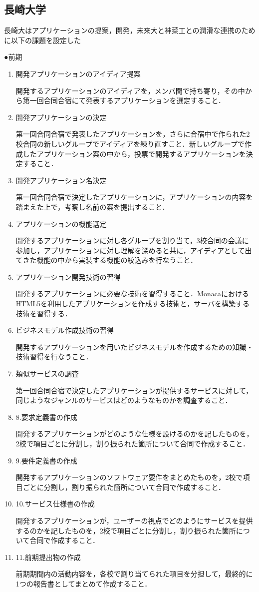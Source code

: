\subsection{長崎大学}
\par 長崎大はアプリケーションの提案，開発，未来大と神菜工との潤滑な連携のために以下の課題を設定した
\par ●前期
\begin{enumerate}
\item 開発アプリケーションのアイディア提案
\par 開発するアプリケーションのアイディアを，メンバ間で持ち寄り，その中から第一回合同合宿にて発表するアプリケーションを選定すること．
\item 開発アプリケーションの決定
\par 第一回合同合宿で発表したアプリケーションを，さらに合宿中で作られた2校合同の新しいグループでアイディアを練り直すこと．新しいグループで作成したアプリケーション案の中から，投票で開発するアプリケーションを決定すること．
\item 開発アプリケーション名決定
\par 第一回合同合宿で決定したアプリケーションに，アプリケーションの内容を踏まえた上で，考察し名前の案を提出すること． 
\item アプリケーションの機能選定
\par 開発するアプリケーションに対し各グループを割り当て，3校合同の会議に参加し，アプリケーションに対し理解を深めると共に，アイディアとして出てきた機能の中から実装する機能の絞込みを行なうこと．
\item アプリケーション開発技術の習得
\par 開発するアプリケーションに必要な技術を習得すること．MonacaにおけるHTML5を利用したアプリケーションを作成する技術と，サーバを構築する技術を習得する．
\item ビジネスモデル作成技術の習得
\par 開発するアプリケーションを用いたビジネスモデルを作成するための知識・技術習得を行なうこと．
\item 類似サービスの調査
\par 第一回合同合宿で決定したアプリケーションが提供するサービスに対して，同じようなジャンルのサービスはどのようなものかを調査すること．
\item 8.要求定義書の作成
\par 開発するアプリケーションがどのような仕様を設けるのかを記したものを，2校で項目ごとに分割し，割り振られた箇所について合同で作成すること．
\item 9.要件定義書の作成
\par 開発するアプリケーションのソフトウェア要件をまとめたものを，2校で項目ごとに分割し，割り振られた箇所について合同で作成すること．
\item 10.サービス仕様書の作成
\par 開発するアプリケーションが，ユーザーの視点でどのようにサービスを提供するのかを記したものを，2校で項目ごとに分割し，割り振られた箇所について合同で作成すること．
\item 11.前期提出物の作成
\par 前期期間内の活動内容を，各校で割り当てられた項目を分担して，最終的に1つの報告書としてまとめて作成すること．
\end{enumerate}
